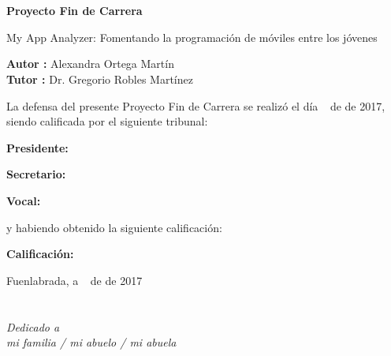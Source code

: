 \documentclass[a4paper, 12pt]{book}
\begin{document}
\clearpage
{}
\chapter*{}

\vspace{-4cm}
\begin{center}
\LARGE
\textbf{Proyecto Fin de Carrera}

\vspace{1cm}
\large
My App Analyzer: Fomentando la programación de móviles entre los jóvenes

\vspace{1cm}
\large
\textbf{Autor :} Alexandra Ortega Martín \\
\textbf{Tutor :} Dr. Gregorio Robles Martínez

\end{center}

\vspace{1cm}
La defensa del presente Proyecto Fin de Carrera se realizó el día \qquad$\;\,$ de \qquad\qquad\qquad\qquad \newline de 2017, siendo calificada por el siguiente tribunal:


\vspace{0.5cm}
\textbf{Presidente:}

\vspace{1.2cm}
\textbf{Secretario:}

\vspace{1.2cm}
\textbf{Vocal:}


\vspace{1.2cm}
y habiendo obtenido la siguiente calificación:

\vspace{1cm}
\textbf{Calificación:}


\vspace{1cm}
\begin{flushright}
Fuenlabrada, a \qquad$\;\,$ de \qquad\qquad\qquad\qquad de 2017
\end{flushright}


\chapter*{}
\begin{flushright}
\textit{Dedicado a \\
mi familia / mi abuelo / mi abuela}
\end{flushright}
\end{document}
